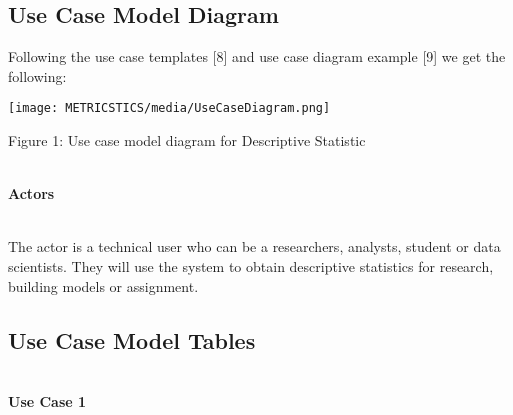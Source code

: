     \subsection{Use Case Model Diagram}
    Following the use case templates {[}8{]} and use case diagram example {[}9{]} we get the following:
    
    \begin{center}
    \texttt{[image: METRICSTICS/media/UseCaseDiagram.png]}
    \end{center}
    
    \begin{center}
    Figure 1: Use case model diagram for Descriptive Statistic
    \end{center}
    
    \strut \\
    \textbf{\large Actors}
    \strut \\
    The actor is a technical user who can be a researchers, analysts, student or data scientists. They will use the system to obtain descriptive statistics for research, building models or assignment.
    
    \pagebreak
    
    \subsection{Use Case Model Tables }
    \strut \\
    \textbf{\large Use Case 1}

